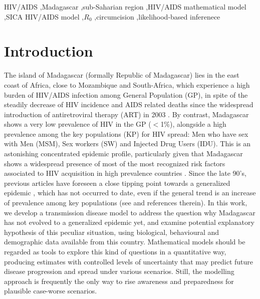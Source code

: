 \documentclass[preprint,12pt]{elsarticle}
\begin{document}
\begin{frontmatter}
\begin{keyword}
HIV/AIDS \sep Madagascar \sep sub-Saharian region \sep HIV/AIDS mathematical model \sep  SICA HIV/AIDS model \sep $R_0$ \sep circumcision \sep likelihood-based inferenece
\end{keyword}

\end{frontmatter}


\newpage

\linenumbers
\section{Introduction}
\label{S:1}
The island of Madagascar (formally Republic of Madagascar) lies in the east coast of Africa, close to Mozambique and South-Africa, which experience a high burden of HIV/AIDS infection among General Population (GP), in spite of the steadily decrease of HIV incidence and AIDS related deaths since the widespread introduction of antiretroviral therapy (ART) in 2003 \cite{UNAIDS2019}. By contrast, Madagascar shows a very low prevalence of HIV in the GP ($<$1\%), alongside a high prevalence among the key populations (KP) for HIV spread: Men who have sex with Men (MSM), Sex workers (SW) and Injected Drug Users (IDU). This is an astonishing concentrated epidemic profile, particularly given that Madagascar shows a widespread presence of most of the most recognized risk factors associated to HIV acquisition in high prevalence countries \cite{Raberahona2020}. Since the late 90’s, previous articles have foreseen a close tipping point towards a generalized epidemic \cite{Behets2001,Raberahona2020}, which has not occurred to date, even if the general trend is an increase of prevalence among key populations (see \cite{Raberahona2020} and references therein). In this work, we develop a transmission disease model to address the question why Madagascar has not evolved to a generalized epidemic yet, and examine potential explanatory hypothesis of this peculiar situation, using biological, behavioural and demographic data available from this country. Mathematical models should be regarded as tools to explore this kind of questions in a quantitative way, producing estimates with controlled levels of uncertainty that may predict future disease progression and spread under various scenarios. Still, the modelling approach is frequently the only way to rise awareness and preparedness for plausible case-worse scenarios.
\smallskip
 
\end{document}
